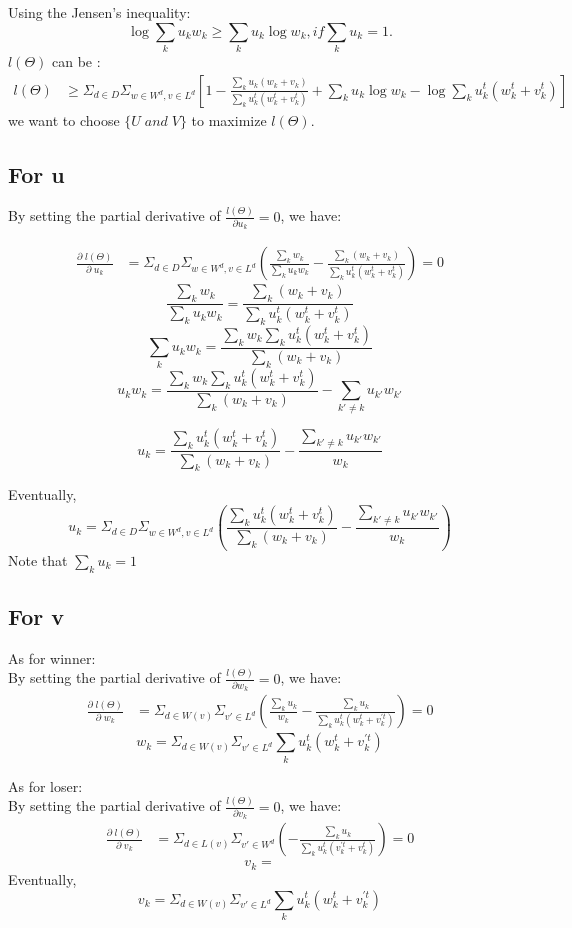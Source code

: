 \documentclass{article}
\begin{document}
Using the Jensen's inequality:
$$ \log \sum_k u_kw_k \geq \sum_k u_k \log w_k,if \sum_k u_k=1. $$ $l(\Theta)$ can be :
\begin{align}
l(\Theta)
& \geq \Sigma_{d \in D} \Sigma_{w\in W^d, v\in L^d} [1- \frac{\sum_k u_k(w_k+v_k)}{\sum_k u_k^t(w_k^t +v_k^t)}+ \sum_k u_k \log  w_k -\log \sum_k u_k^t (w_k^t+v_k^t)]
\end{align}
we want to choose $\{ U \; and \; V\}$ to maximize $ l(\Theta). $

\subsection{For u}


By setting the partial derivative of $\frac{l(\Theta)}{\partial u_k}=0$, we have:

\begin{align}
\frac{\partial \;l(\Theta) }{\partial \;u_k}
 &= \Sigma_{d \in D} \Sigma_{w\in W^d, v\in L^d}(\frac{\sum_k w_k}{\sum_k u_k w_k}-\frac{\sum_k(w_k+v_k)}{\sum_k u_k^t(w_k^t +v_k^t)}) =0
\end{align}
$$ \frac{\sum_k w_k}{\sum_k u_k w_k}=\frac{\sum_k(w_k+v_k)}{\sum_k u_k^t(w_k^t +v_k^t)}$$
$$ \sum_k u_k w_k =\frac{ \sum_k w_k \sum_k u_k^t(w_k^t +v_k^t)}{\sum_k(w_k+v_k)} $$
$$ u_k w_k  = \frac{\sum_k w_k \sum_k u_k^t(w_k^t +v_k^t)}{\sum_k(w_k+v_k)} -\sum_{k' \neq k} u_{k'} w_{k'} $$

$$ u_k = \frac{\sum_k u_k^t(w_k^t +v_k^t)}{\sum_k(w_k+v_k)} - \frac{\sum_{k' \neq k} u_{k'} w_{k'}}{w_k}$$

Eventually,
$$ u_k = \Sigma_{d \in D} \Sigma_{w\in W^d, v\in L^d}(\frac{\sum_k u_k^t(w_k^t +v_k^t)}{\sum_k(w_k+v_k)} - \frac{\sum_{k' \neq k} u_{k'} w_{k'}}{w_k})$$
Note that $\sum_k u_k=1$

\subsection{For v}

As for winner:\\
By setting the partial derivative of $\frac{l(\Theta)}{\partial w_k}=0$, we have:
\begin{align}
\frac{\partial \;l(\Theta)}{\partial \;w_k}
&=  \Sigma_{d \in W(v)} \Sigma_{v'\in L^d}(\frac{\sum_k u_k}{w_k}-\frac{\sum_k u_k}{\sum_k u_k^t(w_k^t +v_k^{'t})})=0
\end{align}
$$ w_k =\Sigma_{d \in W(v)} \Sigma_{v'\in L^d} \sum_k u_k^t(w_k^t +v_k^{'t}) $$

As for loser:\\
By setting the partial derivative of $\frac{l(\Theta)}{\partial v_k}=0$, we have:
\begin{align}
\frac{\partial \;l(\Theta)}{\partial \;v_k}
&=  \Sigma_{d \in L(v)} \Sigma_{v'\in W^d}(-\frac{\sum_k u_k}{\sum_k u_k^t(v_k^{'t} +v_k^t)})=0
\end{align}
$$ v_k =  $$
Eventually,
$$ v_k = \Sigma_{d \in W(v)} \Sigma_{v'\in L^d} \sum_k u_k^t(w_k^t +v_k^{'t}) $$
\end{document}
